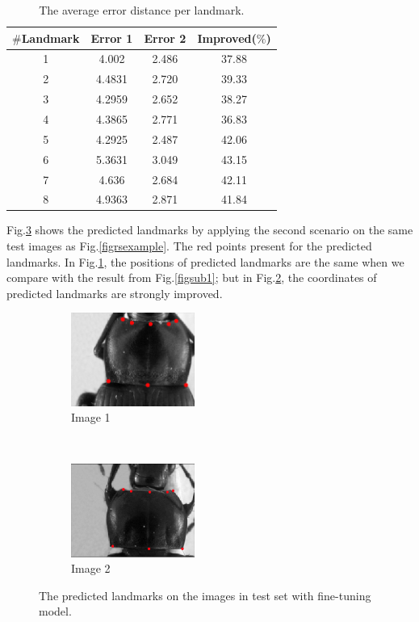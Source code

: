\documentclass[10pt]{article}
\begin{document}
\begin{table}[htbp]
\begin{center}
\begin{tabular}{|c|c|c|c|}
\hline
\textbf{$\#$Landmark} & \textbf{Error 1} & \textbf{Error 2} & \textbf{Improved($\%$)} \\ \hline
1 & 4.002 & 2.486 & 37.88 \\ \hline
2 & 4.4831 & 2.720 & 39.33 \\ \hline
3 & 4.2959  & 2.652 & 38.27 \\ \hline
4 & 4.3865  & 2.771 & 36.83 \\ \hline
5 & 4.2925  & 2.487 & 42.06 \\ \hline
6 & 5.3631  & 3.049 & 43.15 \\ \hline
7 & 4.636  & 2.684 & 42.11 \\ \hline
8 & 4.9363  & 2.871 & 41.84 \\ \hline
\end{tabular}
\caption{The average error distance per landmark.}
\label{tab2}
\end{center}
\end{table}

Fig.\ref{figrsexample2} shows the predicted landmarks by applying the second scenario on the same test images as Fig.\ref{figrsexample}. The red points present for the predicted landmarks. In Fig.\ref{figsub11}, the positions of predicted landmarks are the same when we compare with the result from Fig.\ref{figsub1}; but in Fig.\ref{figsub22}, the coordinates of predicted landmarks are strongly improved.
\begin{figure}[htbp]
    \centering
    \begin{subfigure}[t]{0.25\textwidth}
        \centering
        \includegraphics[height=1.2in]{images/fn_accuracy}
        \caption{Image 1}
        \label{figsub11}
    \end{subfigure}%
    ~ 
    \begin{subfigure}[t]{0.25\textwidth}
        \centering
        \includegraphics[height=1.2in]{images/fn_inaccuracy}
        \caption{Image 2}
        \label{figsub22}
    \end{subfigure}
    \caption{The predicted landmarks on the images in test set with fine-tuning model.}
    \label{figrsexample2}
\end{figure}
\end{document}
